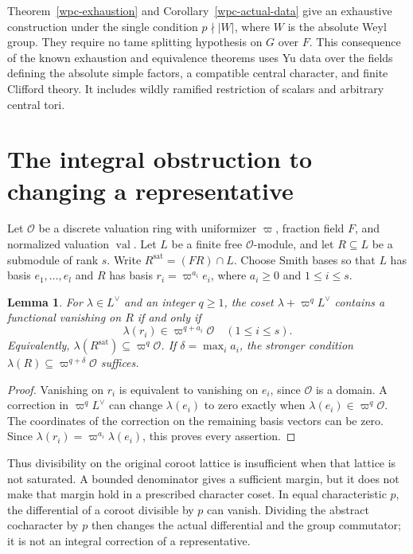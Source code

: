\documentclass[10pt]{amsart}
\newtheorem{lemma}[proposition]{Lemma}
\newcommand{\Ocal}{\mathcal O}
\newcommand{\val}{\operatorname{val}}
\begin{document}
Theorem~\ref{wpc-exhaustion} and Corollary~\ref{wpc-actual-data} give an
exhaustive construction under the single condition $p\nmid|W|$, where $W$
is the absolute Weyl group. They require no tame splitting hypothesis on
$G$ over $F$. This consequence of the known exhaustion and equivalence
theorems uses Yu data over the fields defining the absolute simple factors,
a compatible central character, and finite Clifford theory. It includes
wildly ramified restriction of scalars and arbitrary central tori.

\section{The integral obstruction to changing a representative}

Let $\Ocal$ be a discrete valuation ring with uniformizer $\varpi$, fraction field $F$,
and normalized valuation $\val$. Let $L$ be a finite free $\Ocal$-module, and let
$R\subseteq L$ be a submodule of rank $s$. Write
$R^{\mathrm{sat}}=(FR)\cap L$. Choose Smith bases so that $L$ has basis
$e_1,\ldots,e_l$ and $R$ has basis
$r_i=\varpi^{a_i}e_i$, where $a_i\geq0$ and $1\leq i\leq s$.

\begin{lemma}\label{lem:smith-correction}
For $\lambda\in L^\vee$ and an integer $q\geq1$, the coset
$\lambda+\varpi^qL^\vee$ contains a functional vanishing on $R$ if and only if
\[
 \lambda(r_i)\in\varpi^{q+a_i}\Ocal
 \quad(1\leq i\leq s).
\]
Equivalently, $\lambda(R^{\mathrm{sat}})\subseteq\varpi^q\Ocal$.
If $\delta=\max_i a_i$, the stronger condition
$\lambda(R)\subseteq\varpi^{q+\delta}\Ocal$ suffices.
\end{lemma}

\begin{proof}
Vanishing on $r_i$ is equivalent to vanishing on $e_i$, since $\Ocal$ is a domain.
A correction in $\varpi^qL^\vee$ can change $\lambda(e_i)$ to zero exactly when
$\lambda(e_i)\in\varpi^q\Ocal$. The coordinates of the correction on the remaining
basis vectors can be zero. Since
$\lambda(r_i)=\varpi^{a_i}\lambda(e_i)$, this proves every assertion.
\end{proof}

Thus divisibility on the original coroot lattice is insufficient when that lattice
is not saturated. A bounded denominator gives a sufficient margin, but it does not
make that margin hold in a prescribed character coset. In equal characteristic $p$,
the differential of a coroot divisible by $p$ can vanish. Dividing the abstract
cocharacter by $p$ then changes the actual differential and the group commutator;
it is not an integral correction of a representative.
\end{document}
